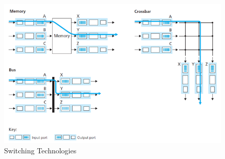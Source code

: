 \documentclass[a4paper]{article}
\theoremstyle{plain}
\theoremstyle{definition}
\begin{document}
\begin{figure}[!h]
    \centering
    \includegraphics[scale=0.8]{cn2.png}
    \caption{Switching Technologies}
    \label{fig:my_label_2}
\end{figure}
\end{document}
